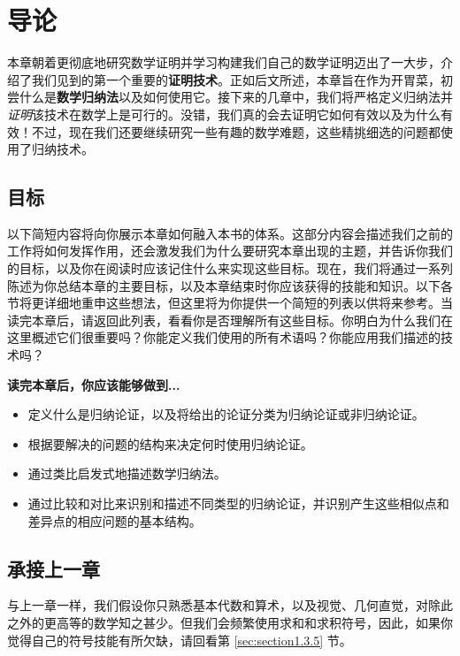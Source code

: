 \section{导论}

本章朝着更彻底地研究数学证明并学习构建我们自己的数学证明迈出了一大步，介绍了我们见到的第一个重要的\textbf{证明技术}。正如后文所述，本章旨在作为开胃菜，初尝什么是\textbf{数学归纳法}以及如何使用它。接下来的几章中，我们将严格定义归纳法并\textit{证明}该技术在数学上是可行的。没错，我们真的会去证明它如何有效以及为什么有效！不过，现在我们还要继续研究一些有趣的数学难题，这些精挑细选的问题都使用了归纳技术。

\subsection{目标}

以下简短内容将向你展示本章如何融入本书的体系。这部分内容会描述我们之前的工作将如何发挥作用，还会激发我们为什么要研究本章出现的主题，并告诉你我们的目标，以及你在阅读时应该记住什么来实现这些目标。现在，我们将通过一系列陈述为你总结本章的主要目标，以及本章结束时你应该获得的技能和知识。以下各节将更详细地重申这些想法，但这里将为你提供一个简短的列表以供将来参考。当读完本章后，请返回此列表，看看你是否理解所有这些目标。你明白为什么我们在这里概述它们很重要吗？你能定义我们使用的所有术语吗？你能应用我们描述的技术吗？

\textbf{读完本章后，你应该能够做到...}

\begin{itemize}
    \item 定义什么是归纳论证，以及将给出的论证分类为归纳论证或非归纳论证。
    \item 根据要解决的问题的结构来决定何时使用归纳论证。
    \item 通过类比启发式地描述数学归纳法。
    \item 通过比较和对比来识别和描述不同类型的归纳论证，并识别产生这些相似点和差异点的相应问题的基本结构。
\end{itemize}

\subsection{承接上一章}

与上一章一样，我们假设你只熟悉基本代数和算术，以及视觉、几何直觉，对除此之外的更高等的数学知之甚少。但我们会频繁使用求和和求积符号，因此，如果你觉得自己的符号技能有所欠缺，请回看第 \ref{sec:section1.3.5} 节。

